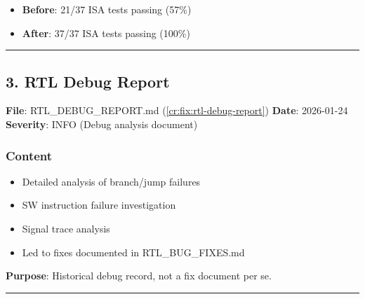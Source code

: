 \begin{record}

\begin{itemize}
\tightlist
\item
  \textbf{Before}: 21/37 ISA tests passing (57\%)
\item
  \textbf{After}: 37/37 ISA tests passing (100\%) \ok{}
\end{itemize}

\begin{center}\rule{0.5\linewidth}{0.5pt}\end{center}

\end{record}

\subsection{3. RTL Debug Report}\label{cr:fix:fixes-index:3-rtl-debug-report}

\begin{record}

\textbf{File}:
RTL\_\allowbreak{}DEBUG\_\allowbreak{}REPORT.md (\cref{cr:fix:rtl-debug-report})
\textbf{Date}: 2026-01-24 \textbf{Severity}: \notemark{} INFO (Debug
analysis document)

\end{record}

\subsubsection{Content}\label{cr:fix:fixes-index:content}

\begin{record}

\begin{itemize}
\tightlist
\item
  Detailed analysis of branch/\allowbreak{}jump failures
\item
  SW instruction failure investigation
\item
  Signal trace analysis
\item
  Led to fixes documented in
  RTL\_\allowbreak{}BUG\_\allowbreak{}FIXES.md
\end{itemize}

\textbf{Purpose}: Historical debug record, not a fix document per se.

\begin{center}\rule{0.5\linewidth}{0.5pt}\end{center}

\end{record}

